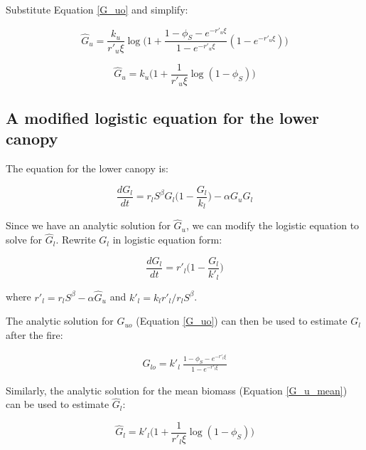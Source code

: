 \documentclass{article}
\begin{document}
Substitute Equation  \ref{G_uo} and simplify:

\begin{equation}
\hat{G}_u =
 \frac{k_u}{r'_u \xi}\log \big(1 +   \frac{1- \phi_S - e^{-r'_u \xi} }{1 - e^{-r'_u \xi}} ( 1 - e^{-r'_u \xi})\big)
\end{equation}


\begin{equation}
\hat{G}_u =
  k_u \big( 1 + \frac{1}{r'_u \xi} \log(1-\phi_S) \big)
		\label{G_u_mean}
\end{equation}

     
\subsection{A modified logistic equation for the lower canopy}
    
    The equation for the lower canopy  is:
    
     \begin{equation}
        \frac{d G_l}{dt} = r_l S^\beta G_l \bigg(1-\frac{G_l}{k_l}\bigg) - \alpha G_u G_l
    \end{equation}
    
    Since we have an analytic solution for $\hat G_u$,  we can modify the logistic equation to solve for $\hat G_l$.
    Rewrite $G_l$  in logistic equation form:
    
      \begin{equation}
        \frac{d G_l}{dt} = r'_l \bigg(1-\frac{G_l}{k'_l}\bigg)
    \end{equation}

    where $r'_l = r_l S^\beta - \alpha \hat G_u$ and $k'_l  = k_l r'_l / r_l S^\beta$.
    
    The analytic solution for $G_{uo}$ (Equation \ref{G_uo}) can then be used to estimate $G_l$ after the fire:
    
    \begin{eqnarray}
      G_{lo} =  k'_l \   \frac{1- \phi_S - e^{-r'_l \xi} }{1 - e^{-r'_l \xi}}
    \end{eqnarray}
    
     Similarly, the analytic solution for the mean  biomass (Equation \ref{G_u_mean}) can be used to estimate  $\hat G_l$:
    
    \begin{equation}
    \hat{G}_l =
     		k'_l \bigg( 1 + \frac{1}{r'_l \xi} \log(1-\phi_S) \bigg)
    \label{hatG_l}
    \end{equation}
    
\end{document}
